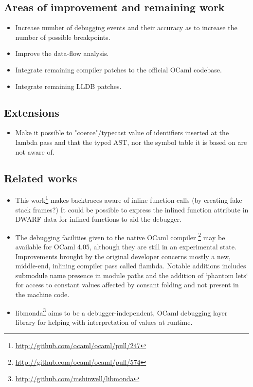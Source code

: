 \subsection{Areas of improvement and remaining work}

\begin{itemize}
    \item Increase number of debugging events and their accuracy as to increase the number of possible breakpoints.
    \item Improve the data-flow analysis.
    \item Integrate remaining compiler patches to the official OCaml codebase.
    \item Integrate remaining LLDB patches.
\end{itemize}

\subsection{Extensions}

\begin{itemize}
    \item Make it possible to "coerce"/typecast value of identifiers inserted at the
lambda pass and that the typed AST, nor the symbol table it is based on are not
aware of.
\end{itemize}

\subsection{Related works}

\begin{itemize}
    \item This work\footnote{\url{http://github.com/ocaml/ocaml/pull/247}} makes backtraces aware
        of inline function calls (by creating fake stack frames?)
        It could be possible to express the inlined function attribute in DWARF data for
        inlined functions to aid the debugger.
    \item The debugging facilities given to the native OCaml compiler \footnote{\url{http://github.com/ocaml/ocaml/pull/574}}
        may be available for OCaml 4.05, although they are still in an
        experimental state.
        Improvements brought by the original developer concerns mostly a
        new, middle-end, inlining compiler pass called flambda.
        Notable additions includes submodule name presence in module paths and
        the addition of `phantom lets` for access to constant values affected by
        consant folding and not present in the machine code.
    \item libmonda\footnote{\url{http://github.com/mshinwell/libmonda}} aims to be a
        debugger-independent, OCaml debugging layer library for helping with
        interpretation of values at runtime.
\end{itemize}

